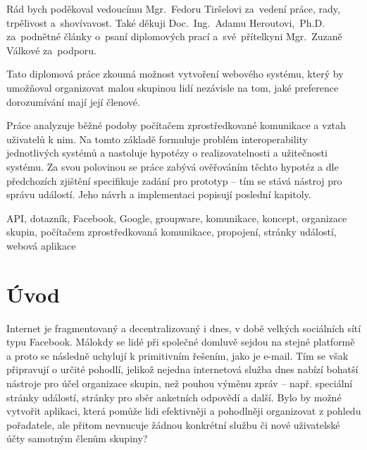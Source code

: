 \documentclass[12pt,oneside,final]{fithesis2}
\begin{document}
\FrontMatter
\ThesisTitlePage



\begin{ThesisDeclaration}
\DeclarationText
\AdvisorName
\end{ThesisDeclaration}



\begin{ThesisThanks}
Rád bych poděkoval vedoucímu Mgr.~Fedoru Tiršelovi za~vedení práce, rady, trpělivost a~shovívavost. Také děkuji Doc.~Ing.~Adamu Heroutovi,~Ph.D. za~podnětné články o~psaní diplomových prací a~své~přítelkyni Mgr.~Zuzaně Válkové za~podporu.
\end{ThesisThanks}



\begin{ThesisAbstract}
Tato diplomová práce zkoumá možnost vytvoření webového systému, který by umožňoval organizovat malou skupinou lidí nezávisle na tom, jaké preference dorozumívání mají její členové.

Práce analyzuje běžné podoby počítačem zprostředkované komunikace a vztah uživatelů k nim. Na tomto základě formuluje problém interoperability jednotlivých systémů a nastoluje hypotézy o realizovatelnosti a užitečnosti systému. Za svou polovinou se práce zabývá ověřováním těchto hypotéz a dle předchozích zjištění specifikuje zadání pro prototyp -- tím se stává nástroj pro správu událostí. Jeho návrh a implementaci popisují poslední kapitoly.
\end{ThesisAbstract}



\begin{ThesisKeyWords}
API, dotazník, Facebook, Google, groupware, komunikace, koncept, organizace skupin, počítačem zprostředkovaná komunikace, propojení, stránky událostí, webová aplikace
\end{ThesisKeyWords}



\tableofcontents
\listoffigures



\MainMatter



\chapter{Úvod}\label{introduction}
Internet je fragmentovaný a decentralizovaný i dnes, v době velkých sociálních sítí typu Facebook. Málokdy se lidé při společné domluvě sejdou na stejné platformě a proto se následně uchylují k primitivním řešením, jako je e-mail. Tím se však připravují o určité pohodlí, jelikož nejedna internetová služba dnes nabízí bohatší nástroje pro účel organizace skupin, než pouhou výměnu zpráv -- např. speciální stránky událostí, stránky pro sběr anketních odpovědí a další. Bylo by možné vytvořit aplikaci, která pomůže lidi efektivněji a pohodlněji organizovat z pohledu pořadatele, ale přitom nevnucuje žádnou konkrétní službu či nové uživatelské účty samotným členům skupiny?
\end{document}
